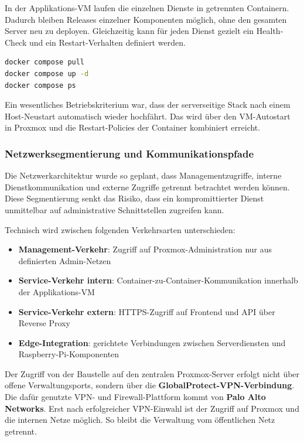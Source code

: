 In der Applikations-VM laufen die einzelnen Dienste in getrennten Containern. Dadurch bleiben Releases einzelner Komponenten möglich, ohne den gesamten Server neu zu deployen. Gleichzeitig kann für jeden Dienst gezielt ein Health-Check und ein Restart-Verhalten definiert werden.

\begin{lstlisting}[language=bash,caption={Beispielhafter Ablauf für Update eines Compose-Stacks auf der Proxmox-VM},label={lst:proxmox_compose_update},basicstyle=\ttfamily\small]
docker compose pull
docker compose up -d
docker compose ps
\end{lstlisting}

Ein wesentliches Betriebskriterium war, dass der serverseitige Stack nach einem Host-Neustart automatisch wieder hochfährt. Das wird über den VM-Autostart in Proxmox und die Restart-Policies der Container kombiniert erreicht.

\subsubsection{Netzwerksegmentierung und Kommunikationspfade}

Die Netzwerkarchitektur wurde so geplant, dass Managementzugriffe, interne Dienstkommunikation und externe Zugriffe getrennt betrachtet werden können. Diese Segmentierung senkt das Risiko, dass ein kompromittierter Dienst unmittelbar auf administrative Schnittstellen zugreifen kann.

Technisch wird zwischen folgenden Verkehrsarten unterschieden:

\begin{itemize}
    \item \textbf{Management-Verkehr}: Zugriff auf Proxmox-Administration nur aus definierten Admin-Netzen
    \item \textbf{Service-Verkehr intern}: Container-zu-Container-Kommunikation innerhalb der Applikations-VM
    \item \textbf{Service-Verkehr extern}: HTTPS-Zugriff auf Frontend und API über Reverse Proxy
    \item \textbf{Edge-Integration}: gerichtete Verbindungen zwischen Serverdiensten und Raspberry-Pi-Komponenten
\end{itemize}

Der Zugriff von der Baustelle auf den zentralen Proxmox-Server erfolgt nicht über offene Verwaltungsports, sondern über die \textbf{GlobalProtect-VPN-Verbindung}. Die dafür genutzte VPN- und Firewall-Plattform kommt von \textbf{Palo Alto Networks}. Erst nach erfolgreicher VPN-Einwahl ist der Zugriff auf Proxmox und die internen Netze möglich. So bleibt die Verwaltung vom öffentlichen Netz getrennt.

